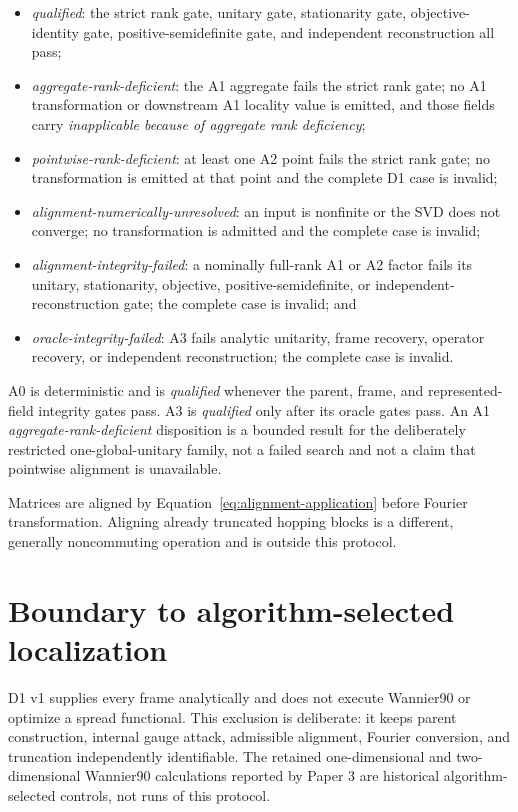 \documentclass[11pt]{article}
\begin{document}
\begin{itemize}
\item \emph{qualified}: the strict rank gate, unitary gate, stationarity gate,
      objective-identity gate, positive-semidefinite gate, and independent reconstruction
      all pass;
\item \emph{aggregate-rank-deficient}: the A1 aggregate fails the strict rank gate; no A1
      transformation or downstream A1 locality value is emitted, and those fields carry
      \emph{inapplicable because of aggregate rank deficiency};
\item \emph{pointwise-rank-deficient}: at least one A2 point fails the strict rank gate;
      no transformation is emitted at that point and the complete D1 case is invalid;
\item \emph{alignment-numerically-unresolved}: an input is nonfinite or the SVD does not
      converge; no transformation is admitted and the complete case is invalid;
\item \emph{alignment-integrity-failed}: a nominally full-rank A1 or A2 factor fails its
      unitary, stationarity, objective, positive-semidefinite, or independent-reconstruction
      gate; the complete case is invalid; and
\item \emph{oracle-integrity-failed}: A3 fails analytic unitarity, frame recovery,
      operator recovery, or independent reconstruction; the complete case is invalid.
\end{itemize}

A0 is deterministic and is \emph{qualified} whenever the parent, frame, and
represented-field integrity gates pass. A3 is \emph{qualified} only after its
oracle gates pass. An A1 \emph{aggregate-rank-deficient} disposition is a bounded result
for the deliberately restricted one-global-unitary family, not a failed search and not a
claim that pointwise alignment is unavailable.

Matrices are aligned by Equation~\eqref{eq:alignment-application} before Fourier
transformation. Aligning already truncated hopping blocks is a different, generally
noncommuting operation and is outside this protocol.

\section{Boundary to algorithm-selected localization}

D1 v1 supplies every frame analytically and does not execute Wannier90 or optimize a
spread functional. This exclusion is deliberate: it keeps parent construction, internal
gauge attack, admissible alignment, Fourier conversion, and truncation independently
identifiable. The retained one-dimensional and two-dimensional Wannier90 calculations
reported by Paper 3 are historical algorithm-selected controls, not runs of this
protocol.
\end{document}

